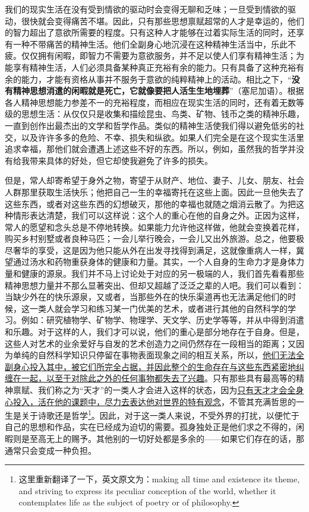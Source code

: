 \documentclass[12pt,oneside]{book}
\begin{document}
我们的现实生活在没有受到情欲的驱动时会变得无聊和乏味；一旦受到情欲的驱动，很快就会变得痛苦不堪。因此，只有那些思想禀赋超常的人才是幸运的，他们的智力超出了意欲所需要的程度。只有这种人才能够在过着实际生活的同时，还享有一种不带痛苦的精神生活。他们全副身心地沉浸在这种精神生活当中，乐此不疲。仅仅拥有闲暇，即智力不需要为意欲服务，并不足以使人们享有精神生活；为能享有精神生活，人们必须具备某种真正充裕有余的能力。只有具备了这种充裕有余的能力，才能有资格从事并不服务于意欲的纯粹精神上的活动。相比之下，“\textbf{没有精神思想消遣的闲暇就是死亡，它就像要把人活生生地埋葬}”（塞尼加语）。根据各人精神思想能力参差不一的充裕程度，而相应在现实生活的同时，还有着无数等级的思想生活：从仅仅只是收集和描绘昆虫、鸟类、矿物、钱币之类的精神乐趣，一直到创作出最杰出的文学和哲学作品。类似的精神生活使我们得以避免低劣的社交，以及许许多多的危险、不幸、损失和纵欲。如果人们完全是在这个现实生活里追求幸福，那他们就会遭遇上述这些不好的东西。所以，例如，虽然我的哲学并没有给我带来具体的好处，但它却使我避免了许多的损失。 

但是，常人却寄希望于身外之物，寄望于从财产、地位、妻子、儿女、朋友、社会人群那里获取生活快乐；他把自己一生的幸福寄托在这些上面。因此一旦他失去了这些东西，或者对这些东西的幻想破灭，那他的幸福也就随之烟消云散了。为把这种情形表达清楚，我们可以这样说：这个人的重心在他的自身之外。正因为这样，常人的愿望和念头总是不停地转换。如果能力允许他这样做，他就会变换着花样，购买乡村别墅或者良种马匹；一会儿举行晚会，一会儿又出外旅游。总之，他要极尽奢华的享受，这是因为他只能从外在出发寻找得到满足，这就像重病人一样，冀望通过汤水和药物重获身体的健康和力量。其实，一个人自身的生命力才是身体力量和健康的源泉。我们并不马上讨论处于对应的另一极端的人，我们首先看看那些精神思想力量并不那么显著突出、但却又超越了泛泛之辈的人吧。我们可以看到：当缺少外在的快乐源泉，又或者，当那些外在的快乐渠道再也无法满足他们的时候，这一类人就会学习和练习某一门优美的艺术，或者进行其他的自然科学的学习。例如：研究植物学、矿物学、物理学、天文学、历史学等等，并从中得到消遣和乐趣。对于这样的人，我们才可以说，他们的重心是部分地存在于自身。但是，这些人对艺术的业余爱好与自发的艺术创造力之间仍然存在一段相当的距离；又因为单纯的自然科学知识只停留在事物表面现象之间的相互关系，所以，\uline{他们无法全副身心投入其中，被它们所完全占据，并因此整个的生命存在与这些东西紧密地纠缠在一起，以至于对除此之外的任何事物都失去了兴趣}。只有那些具有最高等的精神禀赋、我们称之为“天才”的一类人才会进入这样的状态，因为\uline{只有天才才会全身心投入，活在他的课题中，尽力去表达他对世界的特有观念}，不管其充满哲思的一生是关于诗歌还是哲学\footnote{这里重新翻译了一下，英文原文为：making all time and existence its theme, and striving to express its peculiar conception of the world, whether it contemplates life as the subject of poetry or of philosophy.}。因此，对于这一类人来说，不受外界的打扰，以便忙于自己的思想和作品，实在已经成为迫切的需要。孤身独处正是他们求之不得的，闲暇则是至高无上的赐予。其他别的一切好处都是多余的——如果它们存在的话，那通常只会变成一种负担。
\end{document}
